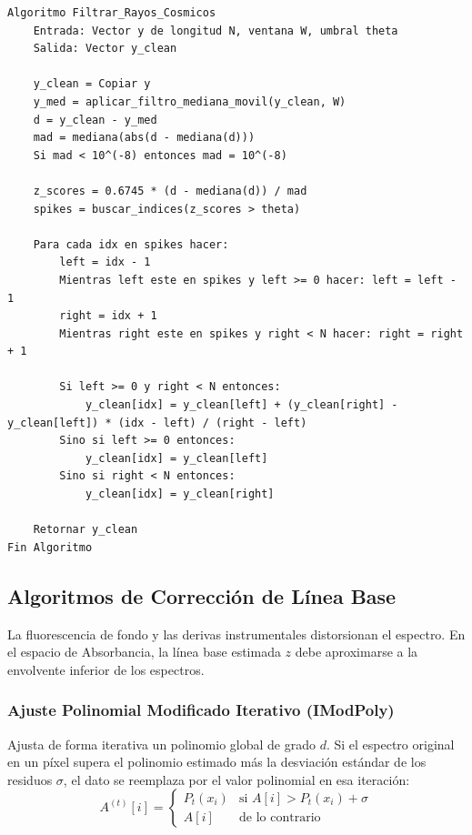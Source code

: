 \begin{lstlisting}[caption=Algoritmo de Filtrado Adaptativo de Rayos Cosmicos]
Algoritmo Filtrar_Rayos_Cosmicos
    Entrada: Vector y de longitud N, ventana W, umbral theta
    Salida: Vector y_clean

    y_clean = Copiar y
    y_med = aplicar_filtro_mediana_movil(y_clean, W)
    d = y_clean - y_med
    mad = mediana(abs(d - mediana(d)))
    Si mad < 10^(-8) entonces mad = 10^(-8)
    
    z_scores = 0.6745 * (d - mediana(d)) / mad
    spikes = buscar_indices(z_scores > theta)
    
    Para cada idx en spikes hacer:
        left = idx - 1
        Mientras left este en spikes y left >= 0 hacer: left = left - 1
        right = idx + 1
        Mientras right este en spikes y right < N hacer: right = right + 1
            
        Si left >= 0 y right < N entonces:
            y_clean[idx] = y_clean[left] + (y_clean[right] - y_clean[left]) * (idx - left) / (right - left)
        Sino si left >= 0 entonces:
            y_clean[idx] = y_clean[left]
        Sino si right < N entonces:
            y_clean[idx] = y_clean[right]
            
    Retornar y_clean
Fin Algoritmo
\end{lstlisting}

\subsection{Algoritmos de Corrección de Línea Base}
La fluorescencia de fondo y las derivas instrumentales distorsionan el espectro. En el espacio de Absorbancia, la línea base estimada $z$ debe aproximarse a la envolvente inferior de los espectros.

\subsubsection{Ajuste Polinomial Modificado Iterativo (IModPoly)}
Ajusta de forma iterativa un polinomio global de grado $d$. Si el espectro original en un píxel supera el polinomio estimado más la desviación estándar de los residuos $\sigma$, el dato se reemplaza por el valor polinomial en esa iteración:
\begin{equation}
    A^{(t)}[i] = \begin{cases} P_t(x_i) & \text{si } A[i] > P_t(x_i) + \sigma \\ A[i] & \text{de lo contrario} \end{cases}
\end{equation}

